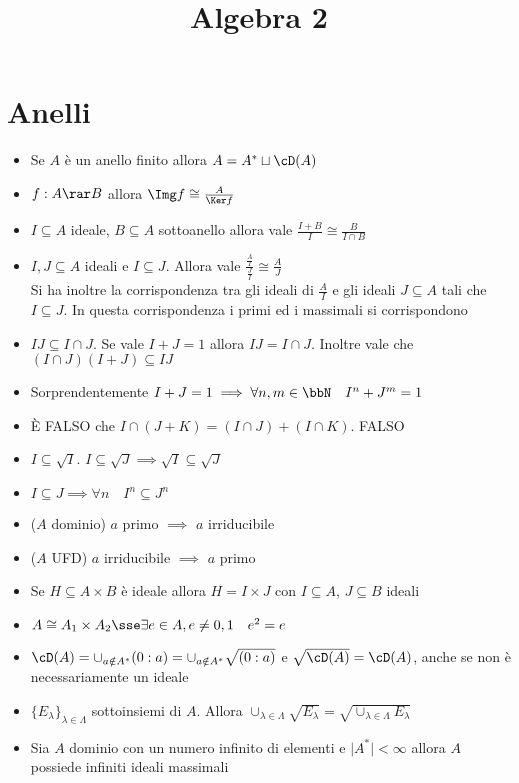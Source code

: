 \documentclass[a4paper,NoNotes,GeneralMath]{stdmdoc}
\begin{document}
	\title{Algebra 2}
	
	\section*{Anelli}
	\begin{itemize}
		\item Se $A$ è un anello finito allora $A = A^* \sqcup \cD(A)$
		\item $f: A \rar B$ allora $\Img f \cong \frac{A}{\Ker f}$
		\item $I \subseteq A$ ideale, $B \subseteq A$ sottoanello allora vale $\frac{I+B}{I} \cong \frac{B}{I\cap B}$
		\item $I, J \subseteq A$ ideali e $I \subseteq J$. Allora vale $\frac{\frac{A}{I}}{\frac{J}{I}} \cong \frac{A}{J}$ \\
			Si ha inoltre la corrispondenza tra gli ideali di $\frac{A}{I}$ e gli ideali $J \subseteq A$ tali che $I \subseteq J$. In questa corrispondenza i primi ed i massimali si corrispondono
		\item $IJ \subseteq I \cap J$. Se vale $I + J = 1$ allora $IJ = I \cap J$. Inoltre vale che $(I \cap J)(I + J) \subseteq IJ$
		\item Sorprendentemente $I + J = 1 \implies \forall n, m \in \bbN \quad I^n + J^m = 1$
		\item È FALSO che $I \cap (J + K) = (I \cap J) + (I \cap K)$. FALSO
		\item $I \subseteq \sqrt{I}$. $I \subseteq \sqrt{J} \implies \sqrt{I} \subseteq \sqrt{J}$
		\item $I \subseteq J \implies \forall n \quad I^n \subseteq J^n$
		\item ($A$ dominio) $a$ primo $\implies$ $a$ irriducibile
		\item ($A$ UFD) $a$ irriducibile $\implies$ $a$ primo
		\item Se $H \subseteq A \times B$ è ideale allora $H = I \times J$ con $I \subseteq A$, $J \subseteq B$ ideali
		\item $A \cong A_1 \times A_2 \sse \exists e \in A, e \neq 0,1 \quad e^2 = e$
		\item $\cD(A) = \cup_{a \notin A^*} (0 : a) = \cup_{a \notin A^*} \sqrt{(0 : a)}$ e $\sqrt{\cD(A)} = \cD(A)$, anche se non è necessariamente un ideale
		\item $\{ E_\lambda \}_{\lambda \in \Lambda}$ sottoinsiemi di $A$. Allora $\cup_{\lambda \in \Lambda} \sqrt{E_\lambda} = \sqrt{\cup_{\lambda \in \Lambda} E_\lambda}$
		\item Sia $A$ dominio con un numero infinito di elementi e $\mid A^* \mid < \infty$ allora $A$ possiede infiniti ideali massimali

\end{itemize}
\end{document}
